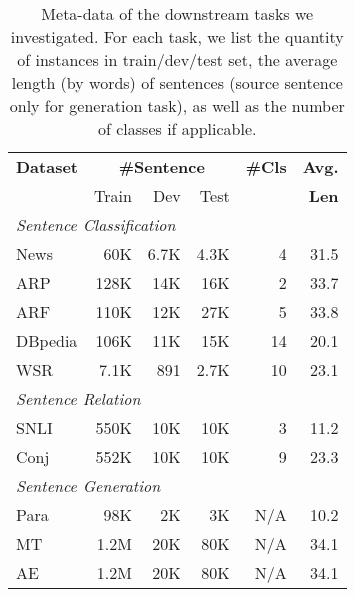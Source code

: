 \documentclass[11pt,a4paper]{article}
\begin{document}
\begin{table}[t]
\centering
\begin{tabular}{lrrrrr}
\toprule 
\textbf{Dataset} & \multicolumn{3}{c}{\textbf{\#Sentence}} & \textbf{\#Cls} & \textbf{Avg.} \\
&       \small Train & \small Dev & \small Test &                        &  \textbf{Len}\\
\midrule
\multicolumn{6}{l}{\textit{Sentence Classification}} \\
\midrule
News		& 60K  & 6.7K & 4.3K	& 4  & 31.5 \\
ARP  	    & 128K & 14K  & 16K	    & 2  & 33.7 \\
ARF	        & 110K & 12K  & 27K 	& 5  & 33.8 \\
DBpedia		& 106K & 11K  & 15K 	& 14 & 20.1 \\
WSR		& 7.1K & 891  & 2.7K	& 10 & 23.1 \\
\midrule
\multicolumn{6}{l}{\textit{Sentence Relation }} \\
\midrule
SNLI 		& 550K & 10K & 10K 	& 3 & 11.2 \\
Conj		& 552K & 10K & 10K	& 9 & 23.3 \\
\midrule
\multicolumn{6}{l}{\textit{Sentence Generation}} \\
\midrule
Para	    & 98K & 2K & 3K	    & N/A & 10.2 \\
MT			& 1.2M & 20K & 80K	& N/A & 34.1 \\
AE			& 1.2M & 20K & 80K	& N/A & 34.1 \\
\bottomrule
\end{tabular}
\caption{\label{table:metadata} Meta-data of the downstream tasks we investigated. 
For each task, we list the quantity of instances in train/dev/test set, the average length (by words) of sentences (source sentence only for generation task), as well as the number of classes if applicable.}
\end{table}
\end{document}
